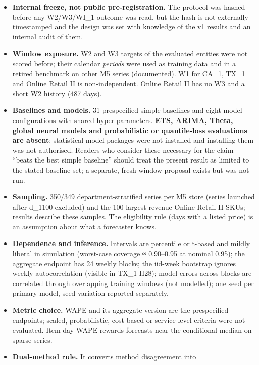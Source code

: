 \documentclass[
]{article}
\providecommand{\tightlist}{%
  \setlength{\itemsep}{0pt}\setlength{\parskip}{0pt}}
\begin{document}
\begin{itemize}
\tightlist
\item
  \textbf{Internal freeze, not public pre-registration.} The protocol
  was hashed before any W2/W3/WI\_1 outcome was read, but the hash is
  not externally timestamped and the design was set with knowledge of
  the v1 results and an internal audit of them.
\item
  \textbf{Window exposure.} W2 and W3 targets of the evaluated entities
  were not scored before; their calendar \emph{periods} were used as
  training data and in a retired benchmark on other M5 series
  (documented). W1 for CA\_1, TX\_1 and Online Retail II is
  non-independent. Online Retail II has no W3 and a short W2 history
  (487 days).
\item
  \textbf{Baselines and models.} 31 prespecified simple baselines and
  eight model configurations with shared hyper-parameters. \textbf{ETS,
  ARIMA, Theta, global neural models and probabilistic or quantile-loss
  evaluations are absent}; statistical-model packages were not installed
  and installing them was not authorised. Readers who consider these
  necessary for the claim ``beats the best simple baseline'' should
  treat the present result as limited to the stated baseline set; a
  separate, fresh-window proposal exists but was not run.
\item
  \textbf{Sampling.} 350/349 department-stratified series per M5 store
  (series launched after d\_1100 excluded) and the 100 largest-revenue
  Online Retail II SKUs; results describe these samples. The eligibility
  rule (days with a listed price) is an assumption about what a
  forecaster knows.
\item
  \textbf{Dependence and inference.} Intervals are percentile or t-based
  and mildly liberal in simulation (worst-case coverage ≈ 0.90--0.95 at
  nominal 0.95); the aggregate endpoint has 24 weekly blocks; the
  iid-week bootstrap ignores weekly autocorrelation (visible in TX\_1
  H28); model errors across blocks are correlated through overlapping
  training windows (not modelled); one seed per primary model, seed
  variation reported separately.
\item
  \textbf{Metric choice.} WAPE and its aggregate version are the
  prespecified endpoints; scaled, probabilistic, cost-based or
  service-level criteria were not evaluated. Item-day WAPE rewards
  forecasts near the conditional median on sparse series.
\item
  \textbf{Dual-method rule.} It converts method disagreement into

\end{itemize}
\end{document}
